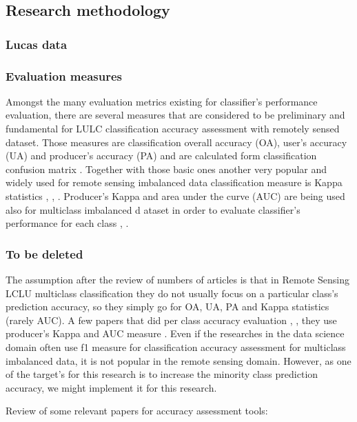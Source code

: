 \documentclass[parskip=full]{scrartcl}
\begin{document}
\subsection{Research methodology}

\subsubsection{Lucas data}

\subsubsection{Evaluation measures}
Amongst the many evaluation metrics existing for classifier's performance 
evaluation, there are several measures that are considered to be preliminary 
and fundamental for LULC classification accuracy assessment with remotely sensed 
dataset. Those measures are classification overall accuracy (OA), user's accuracy 
(UA) and producer's accuracy (PA) and are calculated form classification confusion 
matrix \cite{liu2007}. Together with those basic ones another very popular and 
widely used for remote sensing imbalanced data classification measure is Kappa 
statistics \cite{du2015}, \cite{wang2018}, \cite{foody2002}. Producer's Kappa 
and area under the curve (AUC) are being used also for multiclass imbalanced d
ataset in order to evaluate classifier's performance for each class 
\cite{freeman2012}, \cite{mellor2015}. 

\subsubsection{To be deleted}
The assumption after the review of numbers of articles is that in Remote Sensing 
LCLU multiclass classification they do not usually focus on a particular class's 
prediction accuracy, so they simply go for OA, UA, PA and Kappa statistics 
(rarely AUC). A few papers that did per class accuracy evaluation \cite{mellor2015}, 
\cite{freeman2012}, they use producer's Kappa and AUC measure \cite{freeman2012}. 
Even if the researches in the data science domain often use f1 measure for  
classification accuracy assessment for multiclass imbalanced data, it is not 
popular in the remote sensing domain. However, as one of the target's for this 
research is to increase the minority class prediction accuracy, we might implement 
it for this research.

Review of some relevant papers for accuracy assessment tools:
\end{document}
